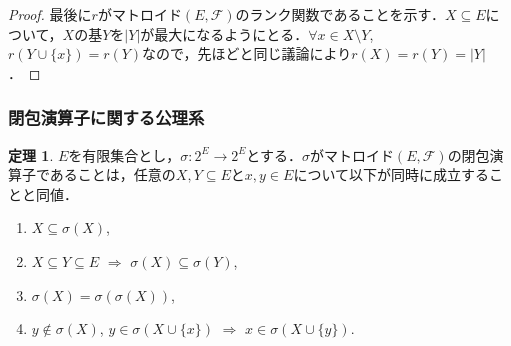 \documentclass[xelatex,ja=standard,a4paper,14pt,everyparhook=compat]{bxjsarticle}
\theoremstyle{definition}
\newtheorem{theorem}{定理}[subsection]
\begin{document}
\begin{proof}
    \newpage

    最後に$r$がマトロイド$(E, \mathcal{F})$のランク関数であることを示す．$X \subseteq E$について，$X$の基$Y$を$|Y|$が最大になるようにとる．$\forall x \in X \setminus Y$, $r(Y \cup \{x\}) = r(Y)$なので，先ほどと同じ議論により$r(X) = r(Y) = |Y|$．
\end{proof}

\subsubsection*{閉包演算子に関する公理系}

\begin{theorem}
    $E$を有限集合とし，$\sigma : 2^E \to 2^E$とする．$\sigma$がマトロイド$(E, \mathcal{F})$の閉包演算子であることは，任意の$X, Y \subseteq E$と$x, y \in E$について以下が同時に成立することと同値． \begin{enumerate}[label=(S\arabic*)]
        \item $X \subseteq \sigma(X)$,
        \item $X \subseteq Y \subseteq E$ $\Longrightarrow$ $\sigma(X) \subseteq \sigma(Y)$,
        \item $\sigma(X) = \sigma(\sigma(X))$,
        \item $y \notin \sigma(X)$, $y \in \sigma(X \cup \{x\})$ $\Longrightarrow$ $x \in \sigma(X \cup \{y\})$.
    \end{enumerate}
\end{theorem}
\end{document}
